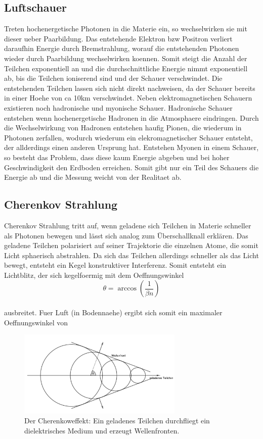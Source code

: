 \subsection{Luftschauer}
Treten hochenergetische Photonen in die Materie ein, so wechselwirken sie mit dieser ueber Paarbildung. Das entstehende Elektron bzw Positron verliert daraufhin Energie durch Bremstrahlung, worauf die entstehenden Photonen wieder durch Paarbildung wechselwirken koennen. Somit steigt die Anzahl der Teilchen exponentiell an und die durchschnittliche Energie nimmt exponentiell ab, bis die Teilchen ioniserend sind und der Schauer verschwindet. Die entstehenden Teilchen lassen sich nicht direkt nachweisen, da der Schauer bereits in einer Hoehe von ca 10km verschwindet. %
Neben elektromagnetischen Schauern existieren noch hadronische und myonische Schauer. Hadronische Schauer entstehen wenn hochenergetische Hadronen in die Atmosphaere eindringen. Durch die Wechselwirkung von Hadronen entstehen haufig Pionen, die wiederum in Photonen zerfallen, wodurch wiederum ein elekromagnetischer Schauer entsteht, der allderdings einen anderen Ursprung hat. Entstehen Myonen in einem Schauer, so besteht das Problem, dass diese kaum Energie abgeben und bei hoher Geschwindigkeit den Erdboden erreichen. Somit gibt nur ein Teil des Schauers die Energie ab und die Messung weicht von der Realitaet ab.

\subsection{Cherenkov Strahlung}
Cherenkov Strahlung tritt auf, wenn geladene sich Teilchen in Materie schneller als Photonen bewegen und lässt sich analog zum Überschallknall erklären. Das geladene Teilchen polarisiert auf seiner Trajektorie die einzelnen Atome, die somit Licht sphaerisch abstrahlen. Da sich das Teilchen allerdings schneller als das Licht bewegt, entsteht ein Kegel konstruktiver Interferenz. Somit entsteht ein Lichtblitz, der sich kegelfoermig mit dem Oeffnungswinkel %
\begin{equation}
\theta = \arccos\left(\frac{1}{\beta n}\right) \label{eq:cherenkow}
\end{equation}\\
ausbreitet. Fuer Luft (in Bodennaehe) ergibt sich somit ein maximaler Oeffnungswinkel von
\begin{figure}[htbp]
\centering
\includegraphics[width=0.7\textwidth]{Images/cherenkow.png}
\caption{Der Cherenkoweffekt: Ein geladenes Teilchen durchfliegt ein dielektrisches Medium und erzeugt Wellenfronten.}
\label{img:cherenkow}
\end{figure}

